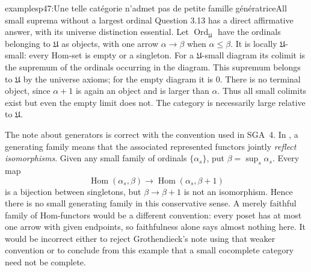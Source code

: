 \begin{dcomment}{examples}{p47:Une telle catégorie n'admet pas de petite famille génératrice}{All small suprema without a largest ordinal}
Question 3.13 has a direct affirmative answer, with its universe distinction essential. Let $\operatorname{Ord}_{\mathfrak U}$ have the ordinals belonging to $\mathfrak U$ as objects, with one arrow $\alpha\to\beta$ when $\alpha\leq\beta$. It is locally $\mathfrak U$-small: every Hom-set is empty or a singleton. For a $\mathfrak U$-small diagram its colimit is the supremum of the ordinals occurring in the diagram. This supremum belongs to $\mathfrak U$ by the universe axioms; for the empty diagram it is $0$. There is no terminal object, since $\alpha+1$ is again an object and is larger than $\alpha$. Thus all small colimits exist but even the empty limit does not. The category is necessarily large relative to $\mathfrak U$.

The note about generators is correct with the convention used in SGA~4. In \citet[Expos\'e~I, 7.1]{SGA4I1972}, a generating family means that the associated represented functors jointly \emph{reflect isomorphisms}. Given any small family of ordinals $\{\alpha_s\}$, put $\beta=\sup_s\alpha_s$. Every map
\[
 \operatorname{Hom}(\alpha_s,\beta)
 \longrightarrow\operatorname{Hom}(\alpha_s,\beta+1)
\]
is a bijection between singletons, but $\beta\to\beta+1$ is not an isomorphism. Hence there is no small generating family in this conservative sense. A merely faithful family of Hom-functors would be a different convention: every poset has at most one arrow with given endpoints, so faithfulness alone says almost nothing here. It would be incorrect either to reject Grothendieck's note using that weaker convention or to conclude from this example that a small cocomplete category need not be complete.
\end{dcomment}

